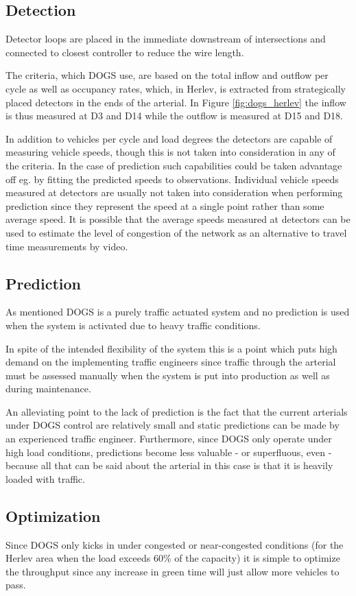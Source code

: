 \subsection{Detection}
Detector loops are placed in the immediate downstream of intersections and connected to closest controller to reduce the wire length. 

The criteria, which DOGS use, are based on the total inflow and outflow per cycle as well as occupancy rates, which, in Herlev, is extracted from strategically placed detectors in the ends of the arterial. In Figure \ref{fig:dogs_herlev} the inflow is thus measured at D3 and D14 while the outflow is measured at D15 and D18. 

In addition to vehicles per cycle and load degrees the detectors are capable of measuring vehicle speeds, though this is not taken into consideration in any of the criteria. In the case of prediction such capabilities could be taken advantage off eg. by fitting the predicted speeds to observations.
Individual vehicle speeds measured at detectors are usually not taken into consideration when performing prediction since they represent the speed at a single point rather than some average speed. It is possible that the average speeds measured at detectors can be used to estimate the level of congestion of the network as an alternative to travel time measurements by video.

\subsection{Prediction}
As mentioned DOGS is a purely traffic actuated system and no prediction is used when the system is activated due to heavy traffic conditions.

In spite of the intended flexibility of the system this is a point which puts high demand on the implementing traffic engineers since traffic through the arterial must be assessed manually when the system is put into production as well as during maintenance.

An alleviating point to the lack of prediction is the fact that the current arterials under DOGS control are relatively small and static predictions can be made by an experienced traffic engineer. Furthermore, since DOGS only operate under high load conditions, predictions become less valuable - or superfluous, even - because all that can be said about the arterial in this case is that it is heavily loaded with traffic.

\subsection{Optimization}
Since DOGS only kicks in under congested or near-congested conditions (for the Herlev area when the load exceeds 60\% of the capacity) it is simple to optimize the throughput since any increase in green time will just allow more vehicles to pass.

